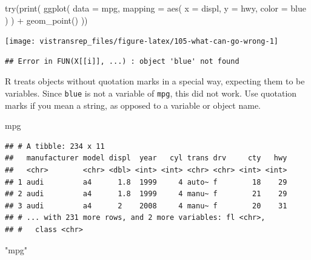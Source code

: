 \documentclass[]{book}
\newenvironment{Shaded}{}{}
\newcommand{\DataTypeTok}[1]{#1}
\newcommand{\KeywordTok}[1]{\textcolor[rgb]{0.00,0.00,1.00}{#1}}
\newcommand{\NormalTok}[1]{#1}
\newcommand{\OperatorTok}[1]{#1}
\newcommand{\StringTok}[1]{\textcolor[rgb]{0.00,0.50,0.50}{#1}}
\begin{document}
\begin{Shaded}
\begin{Highlighting}[]
\KeywordTok{try}\NormalTok{(}\KeywordTok{print}\NormalTok{(}
  \KeywordTok{ggplot}\NormalTok{(}
    \DataTypeTok{data =}\NormalTok{ mpg,}
    \DataTypeTok{mapping =} \KeywordTok{aes}\NormalTok{(}
      \DataTypeTok{x =}\NormalTok{ displ,}
      \DataTypeTok{y =}\NormalTok{ hwy,}
      \DataTypeTok{color =}\NormalTok{ blue}
\NormalTok{    )}
\NormalTok{  ) }\OperatorTok{+}
\StringTok{    }\KeywordTok{geom_point}\NormalTok{()}
\NormalTok{))}
\end{Highlighting}
\end{Shaded}

\begin{flushright}\texttt{[image: vistransrep\_files/figure-latex/105-what-can-go-wrong-1]} \end{flushright}

\begin{verbatim}
## Error in FUN(X[[i]], ...) : object 'blue' not found
\end{verbatim}

R treats objects without quotation marks in a special way, expecting them to be variables.
Since \texttt{blue} is not a variable of \texttt{mpg}, this did not work.
Use quotation marks if you mean a string, as opposed to a variable or object name.

\begin{Shaded}
\begin{Highlighting}[]
\NormalTok{mpg}
\end{Highlighting}
\end{Shaded}

\begin{verbatim}
## # A tibble: 234 x 11
##   manufacturer model displ  year   cyl trans drv     cty   hwy
##   <chr>        <chr> <dbl> <int> <int> <chr> <chr> <int> <int>
## 1 audi         a4      1.8  1999     4 auto~ f        18    29
## 2 audi         a4      1.8  1999     4 manu~ f        21    29
## 3 audi         a4      2    2008     4 manu~ f        20    31
## # ... with 231 more rows, and 2 more variables: fl <chr>,
## #   class <chr>
\end{verbatim}

\begin{Shaded}
\begin{Highlighting}[]
\StringTok{"mpg"}
\end{Highlighting}
\end{Shaded}
\end{document}
